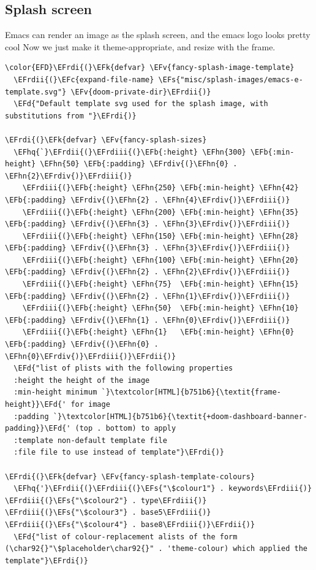 \documentclass{scrartcl}
\newcommand{\EFk}[1]{\textcolor{EFk}{#1}} %
\newcommand{\EFd}[1]{\textcolor{EFd}{\textit{#1}}} %
\newcommand{\EFs}[1]{\textcolor{EFs}{#1}} %
\newcommand{\EFb}[1]{\textcolor{EFb}{#1}} %
\newcommand{\EFc}[1]{\textcolor{EFc}{#1}} %
\newcommand{\EFv}[1]{\textcolor{EFv}{#1}} %
\newcommand{\EFhn}[1]{\textcolor{EFhn}{\textbf{#1}}} %
\newcommand{\EFhq}[1]{\textcolor{EFhq}{#1}} %
\newcommand{\EFrdi}[1]{\textcolor{EFrdi}{#1}} %
\newcommand{\EFrdii}[1]{\textcolor{EFrdii}{#1}} %
\newcommand{\EFrdiii}[1]{\textcolor{EFrdiii}{#1}} %
\newcommand{\EFrdiv}[1]{\textcolor{EFrdiv}{#1}} %
\begin{document}
\subsection{Splash screen}
\label{sec:org7faee95}
Emacs can render an image as the splash screen, and the emacs logo looks pretty cool
Now we just make it theme-appropriate, and resize with the frame.
\begin{Code}
\begin{Verbatim}[]
\color{EFD}\EFrdi{(}\EFk{defvar} \EFv{fancy-splash-image-template}
  \EFrdii{(}\EFc{expand-file-name} \EFs{"misc/splash-images/emacs-e-template.svg"} \EFv{doom-private-dir}\EFrdii{)}
  \EFd{"Default template svg used for the splash image, with substitutions from "}\EFrdi{)}

\EFrdi{(}\EFk{defvar} \EFv{fancy-splash-sizes}
  \EFhq{`}\EFrdii{(}\EFrdiii{(}\EFb{:height} \EFhn{300} \EFb{:min-height} \EFhn{50} \EFb{:padding} \EFrdiv{(}\EFhn{0} . \EFhn{2}\EFrdiv{)}\EFrdiii{)}
    \EFrdiii{(}\EFb{:height} \EFhn{250} \EFb{:min-height} \EFhn{42} \EFb{:padding} \EFrdiv{(}\EFhn{2} . \EFhn{4}\EFrdiv{)}\EFrdiii{)}
    \EFrdiii{(}\EFb{:height} \EFhn{200} \EFb{:min-height} \EFhn{35} \EFb{:padding} \EFrdiv{(}\EFhn{3} . \EFhn{3}\EFrdiv{)}\EFrdiii{)}
    \EFrdiii{(}\EFb{:height} \EFhn{150} \EFb{:min-height} \EFhn{28} \EFb{:padding} \EFrdiv{(}\EFhn{3} . \EFhn{3}\EFrdiv{)}\EFrdiii{)}
    \EFrdiii{(}\EFb{:height} \EFhn{100} \EFb{:min-height} \EFhn{20} \EFb{:padding} \EFrdiv{(}\EFhn{2} . \EFhn{2}\EFrdiv{)}\EFrdiii{)}
    \EFrdiii{(}\EFb{:height} \EFhn{75}  \EFb{:min-height} \EFhn{15} \EFb{:padding} \EFrdiv{(}\EFhn{2} . \EFhn{1}\EFrdiv{)}\EFrdiii{)}
    \EFrdiii{(}\EFb{:height} \EFhn{50}  \EFb{:min-height} \EFhn{10} \EFb{:padding} \EFrdiv{(}\EFhn{1} . \EFhn{0}\EFrdiv{)}\EFrdiii{)}
    \EFrdiii{(}\EFb{:height} \EFhn{1}   \EFb{:min-height} \EFhn{0}  \EFb{:padding} \EFrdiv{(}\EFhn{0} . \EFhn{0}\EFrdiv{)}\EFrdiii{)}\EFrdii{)}
  \EFd{"list of plists with the following properties
  :height the height of the image
  :min-height minimum `}\textcolor[HTML]{b751b6}{\textit{frame-height}}\EFd{' for image
  :padding `}\textcolor[HTML]{b751b6}{\textit{+doom-dashboard-banner-padding}}\EFd{' (top . bottom) to apply
  :template non-default template file
  :file file to use instead of template"}\EFrdi{)}

\EFrdi{(}\EFk{defvar} \EFv{fancy-splash-template-colours}
  \EFhq{'}\EFrdii{(}\EFrdiii{(}\EFs{"\$colour1"} . keywords\EFrdiii{)} \EFrdiii{(}\EFs{"\$colour2"} . type\EFrdiii{)} \EFrdiii{(}\EFs{"\$colour3"} . base5\EFrdiii{)} \EFrdiii{(}\EFs{"\$colour4"} . base8\EFrdiii{)}\EFrdii{)}
  \EFd{"list of colour-replacement alists of the form (\char92{}"\$placeholder\char92{}" . 'theme-colour) which applied the template"}\EFrdi{)}


\end{Verbatim}
\end{Code}
\end{document}
